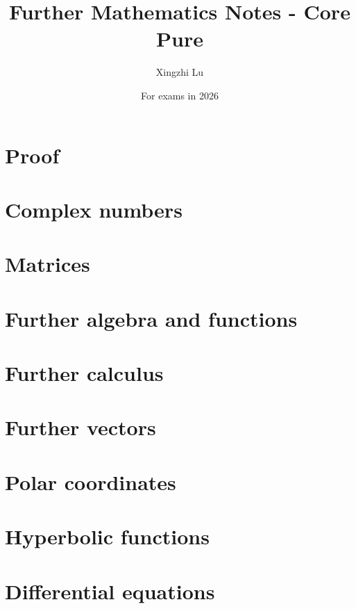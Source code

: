 \documentclass[fleqn, 11pt]{article}
\title{Further Mathematics Notes - Core Pure}
\author{Xingzhi Lu}
\date{For exams in 2026}
\begin{document}
	\maketitle
	\tableofcontents
	\pagebreak
	\section{Proof} %
	 \pagebreak
	
	\section{Complex numbers} %
	 \pagebreak
	
	\section{Matrices} %
	 \pagebreak
	
	\section{Further algebra and functions} %
	 \pagebreak
	
	\section{Further calculus}
	 \pagebreak
	
	\section{Further vectors} %
	 \pagebreak
	
	\section{Polar coordinates} %
	 \pagebreak
	
	\section{Hyperbolic functions}
	 \pagebreak
	
	\section{Differential equations}
	

	
	
	\pagebreak
	
	
\end{document}
